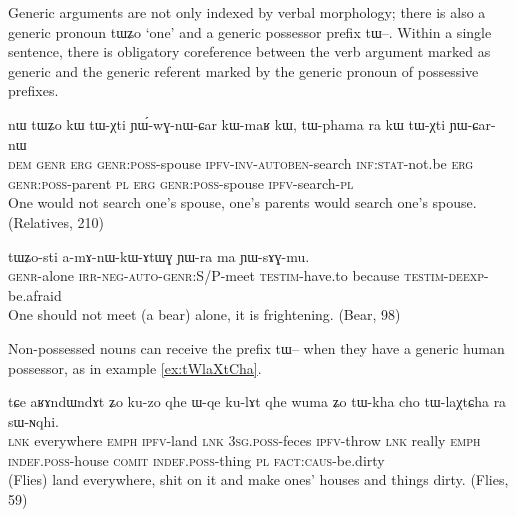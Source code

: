 \documentclass[oldfontcommands,oneside,a4paper,11pt]{article}
\newcommand{\ipa}[1]{{\phon \mbox{#1}}} %
\begin{document}
Generic arguments are not only indexed by verbal morphology; there is also a generic pronoun \ipa{tɯʑo} `one' and a generic possessor prefix \ipa{tɯ--}. Within a single sentence, there is obligatory coreference between the verb argument marked as generic and the generic referent marked by the generic pronoun of possessive prefixes.

\begin{exe}
\ex \label{ex:YWwGnWCar}
\gll
\ipa{nɯ} 	\ipa{tɯʑo} 	\ipa{kɯ} 	\ipa{tɯ-χti} 	\ipa{ɲɯ́-wɣ-nɯ-ɕar} 	\ipa{kɯ-maʁ} 	\ipa{kɯ,} 	\ipa{tɯ-phama} 	\ipa{ra} 	\ipa{kɯ} 	\ipa{tɯ-χti} 	\ipa{ɲɯ-ɕar-nɯ} 	\\
\textsc{dem} \textsc{genr} \textsc{erg} \textsc{genr:poss}-spouse \textsc{ipfv-inv-autoben}-search \textsc{inf:stat}-not.be \textsc{erg} \textsc{genr:poss}-parent \textsc{pl} \textsc{erg} \textsc{genr:poss}-spouse \textsc{ipfv}-search-\textsc{pl} \\
\glt One would not search one's spouse, one's parents would search one's spouse. (Relatives, 210)
\end{exe}


\begin{exe}
\ex \label{ex:YWwGnWCar}
\gll
\ipa{tɯʑo-sti}  	\ipa{a-mɤ-nɯ-kɯ-ɤtɯɣ}  	\ipa{ɲɯ-ra}  	\ipa{ma}  	\ipa{ɲɯ-sɤɣ-mu.}  \\
\textsc{genr}-alone \textsc{irr-neg-auto-genr:S/P}-meet \textsc{testim}-have.to because \textsc{testim-deexp}-be.afraid \\
\glt One should not meet (a bear) alone, it is frightening. (Bear, 98)
\end{exe}


Non-possessed nouns can receive the prefix \ipa{tɯ--} when they have a generic human possessor, as in example \ref{ex:tWlaXtCha}. 

\begin{exe}
\ex \label{ex:tWlaXtCha}
\gll 
\ipa{tɕe}  	\ipa{aʁɤndɯndɤt}  	\ipa{ʑo}  	\ipa{ku-zo}  	\ipa{qhe}  	\ipa{ɯ-qe}  	\ipa{ku-lɤt}  	\ipa{qhe}	\ipa{wuma}  	\ipa{ʑo}  	\ipa{tɯ-kha}  	\ipa{cho}  	\ipa{tɯ-laχtɕha}  	\ipa{ra}  	\ipa{sɯ-ɴqhi.}  \\
\textsc{lnk} everywhere \textsc{emph} \textsc{ipfv}-land \textsc{lnk} \textsc{3sg.poss}-feces \textsc{ipfv}-throw \textsc{lnk} really \textsc{emph} \textsc{indef.poss}-house \textsc{comit} \textsc{indef.poss}-thing \textsc{pl} \textsc{fact:caus}-be.dirty \\
\glt (Flies) land everywhere, shit on it and make ones' houses and things dirty. (Flies, 59)
\end{exe}
\end{document}

